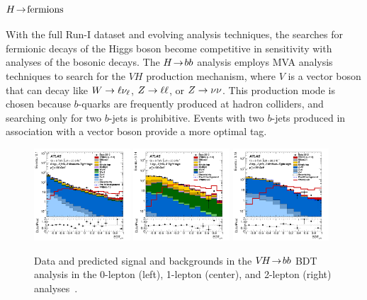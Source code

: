 \subsubsection{$H \!\rightarrow\! \text{fermions}$}

With the full Run-I dataset and evolving analysis techniques, the searches for fermionic decays of the Higgs boson become competitive in sensitivity with analyses of the bosonic decays. The $H \!\rightarrow\! bb$ analysis employs MVA analysis techniques to search for the $VH$ production mechanism, where $V$ is a vector boson that can decay like $W \rightarrow \ell\nu_\ell$, $Z \rightarrow \ell\ell$, or $Z \rightarrow \nu\nu$. This production mode is chosen because $b$-quarks are frequently produced at hadron colliders, and searching only for two $b$-jets is prohibitive. Events with two $b$-jets produced in association with a vector boson provide a more optimal tag.

\begin{figure}[tp]
  \centering
  \includegraphics[width=0.32\textwidth]{figures/HIGG-2013-23/fig_11a}
  \includegraphics[width=0.32\textwidth]{figures/HIGG-2013-23/fig_12c}
  \includegraphics[width=0.32\textwidth]{figures/HIGG-2013-23/fig_13b}
  \caption{Data and predicted signal and backgrounds in the $V\!H \!\rightarrow\! bb$ BDT analysis in the 0-lepton (left), 1-lepton (center), and 2-lepton (right) analyses~\cite{HIGG-2013-23}.}
  \label{fig:strategy-higgs-yyzzww}
\end{figure}

